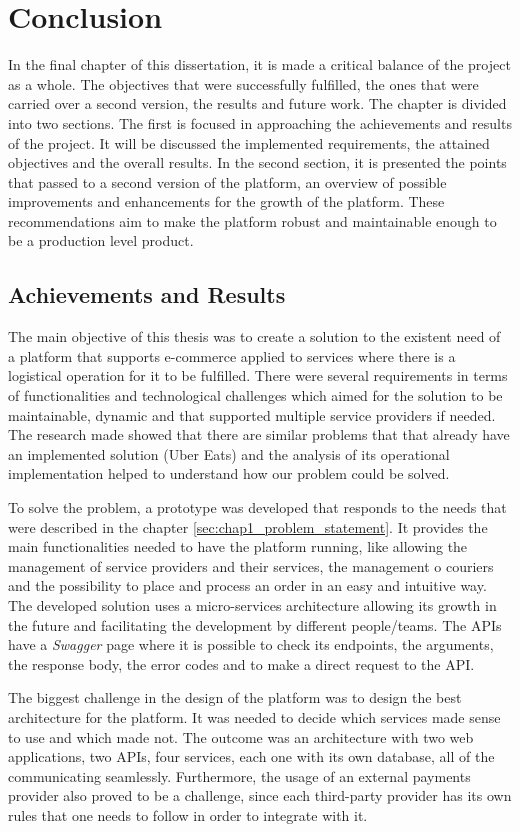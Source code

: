 \chapter{Conclusion} %
\label{chap:Conclusion}
In the final chapter of this dissertation, it is made a critical balance of the project as a whole. The objectives that were successfully fulfilled, the ones that were carried over a second version, the results and future work. The chapter is divided into two sections. The first is focused in approaching the achievements and results of the project. It will be discussed the implemented requirements, the attained objectives and the overall results. In the second section, it is presented the points that passed to a second version of the platform, an overview of possible improvements and enhancements for the growth of the platform. These recommendations aim to make the platform robust and maintainable enough to be a production level product.

\section{Achievements and Results}
The main objective of this thesis was to create a solution to the existent need of a platform that supports e-commerce applied to services where there is a logistical operation for it to be fulfilled. There were several requirements in terms of functionalities and technological challenges which aimed for the solution to be maintainable, dynamic and that supported multiple service providers if needed. The research made showed that there are similar problems that that already have an implemented solution (Uber Eats) and the analysis of its operational implementation helped to understand how our problem could be solved.

\par
To solve the problem, a prototype was developed that responds to the needs that were described in the chapter \ref{sec:chap1_problem_statement}. It provides the main functionalities needed to have the platform running, like allowing the management of service providers and their services, the management o couriers and the possibility to place and process an order in an easy and intuitive way. The developed solution uses a micro-services architecture allowing its growth in the future and facilitating the development by different people/teams. The APIs have a \textit{Swagger} page where it is possible to check its endpoints, the arguments, the response body, the error codes and to make a direct request to the \gls{API}. 
\par
The biggest challenge in the design of the platform was to design the best architecture for the platform. It was needed to decide which services made sense to use and which made not. The outcome was an architecture with two web applications, two \gls{API}s, four services, each one with its own database, all of the communicating seamlessly. Furthermore, the usage of an external payments provider also proved to be a challenge, since each third-party provider has its own rules that one needs to follow in order to integrate with it.

